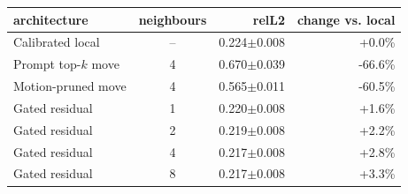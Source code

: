 \begin{tabular}{@{}lcrr@{}}
\toprule
architecture & neighbours & relL2 & change vs. local \\
\midrule
Calibrated local & -- & 0.224$\pm$0.008 & +0.0\% \\
Prompt top-$k$ move & 4 & 0.670$\pm$0.039 & -66.6\% \\
Motion-pruned move & 4 & 0.565$\pm$0.011 & -60.5\% \\
Gated residual & 1 & 0.220$\pm$0.008 & +1.6\% \\
Gated residual & 2 & 0.219$\pm$0.008 & +2.2\% \\
Gated residual & 4 & 0.217$\pm$0.008 & +2.8\% \\
Gated residual & 8 & 0.217$\pm$0.008 & +3.3\% \\
\bottomrule
\end{tabular}
